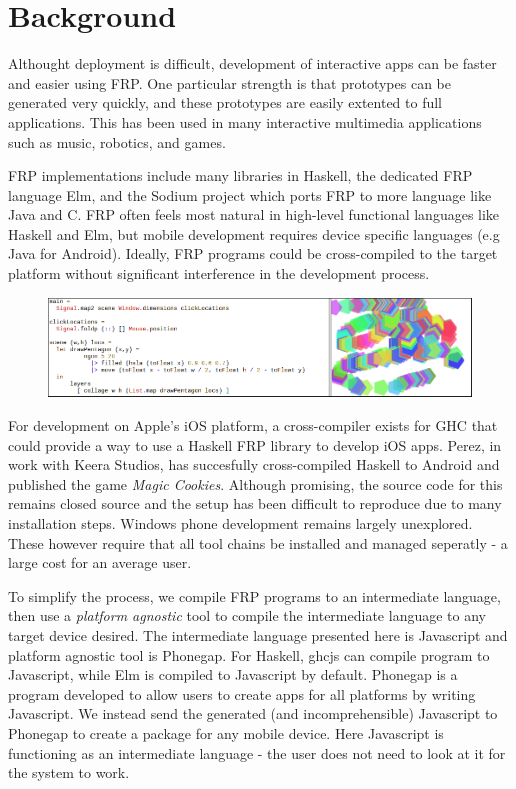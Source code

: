 \documentclass[preprint]{sigplanconf}
\begin{document}

\section{Background}
Althought deployment is difficult, development of interactive apps can be faster and easier using FRP.
One particular strength is that prototypes can be generated very quickly, and these prototypes are easily extented to full applications.
This has been used in many interactive multimedia applications such as music, robotics, and games\cite{}.

FRP implementations include many libraries in Haskell, the dedicated FRP language Elm, and the Sodium project which ports FRP to more language like Java and C.
FRP often feels most natural in high-level functional languages like Haskell and Elm, but mobile development requires device specific languages (e.g Java for Android).
Ideally, FRP programs could be cross-compiled to the target platform without significant interference in the development process.

\begin{figure}[H]
 \centering
 \includegraphics{easy.png}
\end{figure}

For development on Apple's iOS platform, a cross-compiler exists for GHC that could provide a way to use a Haskell FRP library to develop iOS apps.
Perez, in work with Keera Studios, has succesfully cross-compiled Haskell to Android and published the game \textit{Magic Cookies}\cite{}.
Although promising, the source code for this remains closed source and the setup has been difficult to reproduce due to many installation steps.
Windows phone development remains largely unexplored.
These however require that all tool chains be installed and managed seperatly - a large cost for an average user.

To simplify the process, we compile FRP programs to an intermediate language, then use a \textit{platform agnostic} tool to compile the intermediate language to any target device desired.
The intermediate language presented here is Javascript and platform agnostic tool is Phonegap.
For Haskell, ghcjs can compile program to Javascript, while Elm is compiled to Javascript by default.
Phonegap is a program developed to allow users to create apps for all platforms by writing Javascript. 
We instead send the generated (and incomprehensible) Javascript to Phonegap to create a package for any mobile device.
Here Javascript is functioning as an intermediate language - the user does not need to look at it for the system to work.
\end{document}
